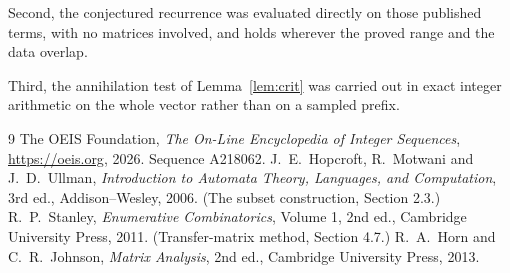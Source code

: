 \documentclass[11pt,a4paper]{article}
\theoremstyle{plain}
\theoremstyle{definition}
\begin{document}
Second, the conjectured recurrence was evaluated directly on those published terms, with no
matrices involved, and holds wherever the proved range and the data overlap.

Third, the annihilation test of Lemma~\ref{lem:crit} was carried out in exact integer
arithmetic on the whole vector rather than on a sampled prefix.

\begin{thebibliography}{9}
 The OEIS Foundation, \emph{The On-Line Encyclopedia of Integer
Sequences}, \url{https://oeis.org}, 2026. Sequence A218062.
 J.~E.~Hopcroft, R.~Motwani and J.~D.~Ullman, \emph{Introduction to Automata
Theory, Languages, and Computation}, 3rd ed., Addison--Wesley, 2006. (The subset
construction, Section 2.3.)
 R.~P.~Stanley, \emph{Enumerative Combinatorics}, Volume 1, 2nd ed.,
Cambridge University Press, 2011. (Transfer-matrix method, Section 4.7.)
 R.~A.~Horn and C.~R.~Johnson, \emph{Matrix Analysis}, 2nd ed., Cambridge
University Press, 2013.
\end{thebibliography}
\end{document}

